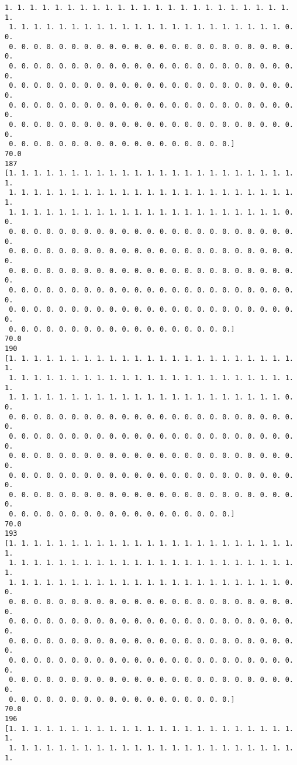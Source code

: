 \documentclass[11pt]{article}
\begin{document}
\begin{Verbatim}[commandchars=\\\{\}]
 1. 1. 1. 1. 1. 1. 1. 1. 1. 1. 1. 1. 1. 1. 1. 1. 1. 1. 1. 1. 1. 1. 1. 1.
 1. 1. 1. 1. 1. 1. 1. 1. 1. 1. 1. 1. 1. 1. 1. 1. 1. 1. 1. 1. 1. 1. 0. 0.
 0. 0. 0. 0. 0. 0. 0. 0. 0. 0. 0. 0. 0. 0. 0. 0. 0. 0. 0. 0. 0. 0. 0. 0.
 0. 0. 0. 0. 0. 0. 0. 0. 0. 0. 0. 0. 0. 0. 0. 0. 0. 0. 0. 0. 0. 0. 0. 0.
 0. 0. 0. 0. 0. 0. 0. 0. 0. 0. 0. 0. 0. 0. 0. 0. 0. 0. 0. 0. 0. 0. 0. 0.
 0. 0. 0. 0. 0. 0. 0. 0. 0. 0. 0. 0. 0. 0. 0. 0. 0. 0. 0. 0. 0. 0. 0. 0.
 0. 0. 0. 0. 0. 0. 0. 0. 0. 0. 0. 0. 0. 0. 0. 0. 0. 0. 0. 0. 0. 0. 0. 0.
 0. 0. 0. 0. 0. 0. 0. 0. 0. 0. 0. 0. 0. 0. 0. 0. 0. 0.]
70.0
187
[1. 1. 1. 1. 1. 1. 1. 1. 1. 1. 1. 1. 1. 1. 1. 1. 1. 1. 1. 1. 1. 1. 1. 1.
 1. 1. 1. 1. 1. 1. 1. 1. 1. 1. 1. 1. 1. 1. 1. 1. 1. 1. 1. 1. 1. 1. 1. 1.
 1. 1. 1. 1. 1. 1. 1. 1. 1. 1. 1. 1. 1. 1. 1. 1. 1. 1. 1. 1. 1. 1. 0. 0.
 0. 0. 0. 0. 0. 0. 0. 0. 0. 0. 0. 0. 0. 0. 0. 0. 0. 0. 0. 0. 0. 0. 0. 0.
 0. 0. 0. 0. 0. 0. 0. 0. 0. 0. 0. 0. 0. 0. 0. 0. 0. 0. 0. 0. 0. 0. 0. 0.
 0. 0. 0. 0. 0. 0. 0. 0. 0. 0. 0. 0. 0. 0. 0. 0. 0. 0. 0. 0. 0. 0. 0. 0.
 0. 0. 0. 0. 0. 0. 0. 0. 0. 0. 0. 0. 0. 0. 0. 0. 0. 0. 0. 0. 0. 0. 0. 0.
 0. 0. 0. 0. 0. 0. 0. 0. 0. 0. 0. 0. 0. 0. 0. 0. 0. 0. 0. 0. 0. 0. 0. 0.
 0. 0. 0. 0. 0. 0. 0. 0. 0. 0. 0. 0. 0. 0. 0. 0. 0. 0.]
70.0
190
[1. 1. 1. 1. 1. 1. 1. 1. 1. 1. 1. 1. 1. 1. 1. 1. 1. 1. 1. 1. 1. 1. 1. 1.
 1. 1. 1. 1. 1. 1. 1. 1. 1. 1. 1. 1. 1. 1. 1. 1. 1. 1. 1. 1. 1. 1. 1. 1.
 1. 1. 1. 1. 1. 1. 1. 1. 1. 1. 1. 1. 1. 1. 1. 1. 1. 1. 1. 1. 1. 1. 0. 0.
 0. 0. 0. 0. 0. 0. 0. 0. 0. 0. 0. 0. 0. 0. 0. 0. 0. 0. 0. 0. 0. 0. 0. 0.
 0. 0. 0. 0. 0. 0. 0. 0. 0. 0. 0. 0. 0. 0. 0. 0. 0. 0. 0. 0. 0. 0. 0. 0.
 0. 0. 0. 0. 0. 0. 0. 0. 0. 0. 0. 0. 0. 0. 0. 0. 0. 0. 0. 0. 0. 0. 0. 0.
 0. 0. 0. 0. 0. 0. 0. 0. 0. 0. 0. 0. 0. 0. 0. 0. 0. 0. 0. 0. 0. 0. 0. 0.
 0. 0. 0. 0. 0. 0. 0. 0. 0. 0. 0. 0. 0. 0. 0. 0. 0. 0. 0. 0. 0. 0. 0. 0.
 0. 0. 0. 0. 0. 0. 0. 0. 0. 0. 0. 0. 0. 0. 0. 0. 0. 0.]
70.0
193
[1. 1. 1. 1. 1. 1. 1. 1. 1. 1. 1. 1. 1. 1. 1. 1. 1. 1. 1. 1. 1. 1. 1. 1.
 1. 1. 1. 1. 1. 1. 1. 1. 1. 1. 1. 1. 1. 1. 1. 1. 1. 1. 1. 1. 1. 1. 1. 1.
 1. 1. 1. 1. 1. 1. 1. 1. 1. 1. 1. 1. 1. 1. 1. 1. 1. 1. 1. 1. 1. 1. 0. 0.
 0. 0. 0. 0. 0. 0. 0. 0. 0. 0. 0. 0. 0. 0. 0. 0. 0. 0. 0. 0. 0. 0. 0. 0.
 0. 0. 0. 0. 0. 0. 0. 0. 0. 0. 0. 0. 0. 0. 0. 0. 0. 0. 0. 0. 0. 0. 0. 0.
 0. 0. 0. 0. 0. 0. 0. 0. 0. 0. 0. 0. 0. 0. 0. 0. 0. 0. 0. 0. 0. 0. 0. 0.
 0. 0. 0. 0. 0. 0. 0. 0. 0. 0. 0. 0. 0. 0. 0. 0. 0. 0. 0. 0. 0. 0. 0. 0.
 0. 0. 0. 0. 0. 0. 0. 0. 0. 0. 0. 0. 0. 0. 0. 0. 0. 0. 0. 0. 0. 0. 0. 0.
 0. 0. 0. 0. 0. 0. 0. 0. 0. 0. 0. 0. 0. 0. 0. 0. 0. 0.]
70.0
196
[1. 1. 1. 1. 1. 1. 1. 1. 1. 1. 1. 1. 1. 1. 1. 1. 1. 1. 1. 1. 1. 1. 1. 1.
 1. 1. 1. 1. 1. 1. 1. 1. 1. 1. 1. 1. 1. 1. 1. 1. 1. 1. 1. 1. 1. 1. 1. 1.

\end{Verbatim}
\end{document}
